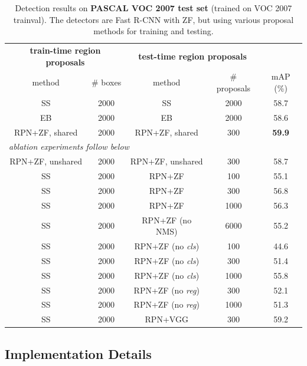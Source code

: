 \documentclass[10pt,journal,cspaper,compsoc]{IEEEtran}
\begin{document}
\setlength{\tabcolsep}{8pt}
\renewcommand{\arraystretch}{1.1}
\begin{table}[t]
\begin{center}
\caption{Detection results on \textbf{PASCAL VOC 2007 test set} (trained on VOC 2007 trainval). The detectors are Fast R-CNN with ZF, but using various proposal methods for training and testing.}
\vspace{-1em}
\small
\begin{tabular}{cc|cc|c}
  \multicolumn{2}{c|}{\bf train-time region proposals} & \multicolumn{2}{c|}{\bf test-time region proposals} &   \\
  method & \# boxes & method & \# proposals &  mAP (\%) \\
  \hline\hline
  SS & 2000 & SS & 2000 & 58.7 \\
  EB & 2000 & EB & 2000 & 58.6 \\
  RPN+ZF, shared & 2000 & RPN+ZF, shared & 300 & \textbf{59.9} \\
  \hline
  \hline
  \multicolumn{5}{l}{\emph{ablation experiments follow below}} \\
  \hline
  \hline
  RPN+ZF, unshared & 2000 & RPN+ZF, unshared & 300 & 58.7 \\
  \hline
  SS & 2000 & RPN+ZF & 100 & 55.1 \\
  SS & 2000 & RPN+ZF & 300 & 56.8 \\
  SS & 2000 & RPN+ZF & 1000 & 56.3 \\
  SS & 2000 & RPN+ZF (no NMS) & 6000 & 55.2 \\
  \hline
  SS & 2000 & RPN+ZF (no \emph{cls}) & 100 & 44.6 \\
  SS & 2000 & RPN+ZF (no \emph{cls}) & 300 & 51.4 \\
  SS & 2000 & RPN+ZF (no \emph{cls}) & 1000 & 55.8 \\
  \hline
  SS & 2000 & RPN+ZF (no \emph{reg}) & 300 & 52.1 \\
  SS & 2000 & RPN+ZF (no \emph{reg}) & 1000 & 51.3 \\
  \hline
  SS & 2000 & RPN+VGG & 300 & 59.2 \\
\end{tabular}
\label{tab:results}
\end{center}
\end{table}

\subsection{Implementation Details}
\end{document}
